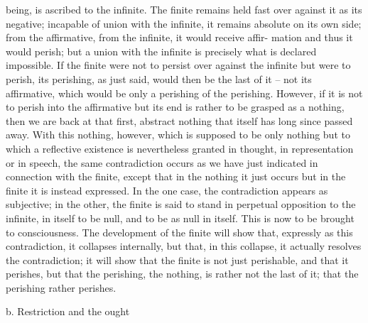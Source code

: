 being, is ascribed to the infinite. The finite remains held fast over against it
as its negative; incapable of union with the infinite, it remains absolute on
its own side; from the affirmative, from the infinite, it would receive affir-
mation and thus it would perish; but a union with the infinite is precisely
what is declared impossible. If the finite were not to persist over against
the infinite but were to perish, its perishing, as just said, would then be
the last of it – not its affirmative, which would be only a perishing of the
perishing. However, if it is not to perish into the affirmative but its end
is rather to be grasped as a nothing, then we are back at that first, abstract
nothing that itself has long since passed away.
With this nothing, however, which is supposed to be only nothing
but to which a reflective existence is nevertheless granted in thought, in
representation or in speech, the same contradiction occurs as we have
just indicated in connection with the finite, except that in the nothing
it just occurs but in the finite it is instead expressed. In the one case, the
contradiction appears as subjective; in the other, the finite is said to stand
in perpetual opposition to the infinite, in itself to be null, and to be as null
in itself. This is now to be brought to consciousness. The development
of the finite will show that, expressly as this contradiction, it collapses
internally, but that, in this collapse, it actually resolves the contradiction; it
will show that the finite is not just perishable, and that it perishes, but that
the perishing, the nothing, is rather not the last of it; that the perishing
rather perishes.

b. Restriction and the ought

